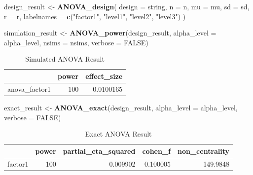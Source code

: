 \documentclass[
]{book}
\newenvironment{Shaded}{\begin{snugshade}}{\end{snugshade}}
\newcommand{\DataTypeTok}[1]{\textcolor[rgb]{0.13,0.29,0.53}{#1}}
\newcommand{\KeywordTok}[1]{\textcolor[rgb]{0.13,0.29,0.53}{\textbf{#1}}}
\newcommand{\NormalTok}[1]{#1}
\newcommand{\OtherTok}[1]{\textcolor[rgb]{0.56,0.35,0.01}{#1}}
\newcommand{\StringTok}[1]{\textcolor[rgb]{0.31,0.60,0.02}{#1}}
\begin{document}
\begin{Shaded}
\begin{Highlighting}[]
\NormalTok{design_result <-}\StringTok{ }\KeywordTok{ANOVA_design}\NormalTok{(}
  \DataTypeTok{design =}\NormalTok{ string,}
  \DataTypeTok{n =}\NormalTok{ n,}
  \DataTypeTok{mu =}\NormalTok{ mu,}
  \DataTypeTok{sd =}\NormalTok{ sd,}
  \DataTypeTok{r =}\NormalTok{ r,}
  \DataTypeTok{labelnames =} \KeywordTok{c}\NormalTok{(}\StringTok{"factor1"}\NormalTok{, }\StringTok{"level1"}\NormalTok{, }\StringTok{"level2"}\NormalTok{, }\StringTok{"level3"}\NormalTok{)}
\NormalTok{  )}
\end{Highlighting}
\end{Shaded}

\begin{Shaded}
\begin{Highlighting}[]
\NormalTok{simulation_result <-}\StringTok{ }\KeywordTok{ANOVA_power}\NormalTok{(design_result, }
                                 \DataTypeTok{alpha_level =}\NormalTok{ alpha_level, }
                                 \DataTypeTok{nsims =}\NormalTok{ nsims,}
                                 \DataTypeTok{verbose =} \OtherTok{FALSE}\NormalTok{)}
\end{Highlighting}
\end{Shaded}

\begin{table}[!h]

\caption{\label{tab:unnamed-chunk-50}Simulated ANOVA Result}
\centering
\begin{tabular}[t]{l|r|r}
\hline
  & power & effect\_size\\
\hline
anova\_factor1 & 100 & 0.0100165\\
\hline
\end{tabular}
\end{table}

\begin{Shaded}
\begin{Highlighting}[]
\NormalTok{exact_result <-}\StringTok{ }\KeywordTok{ANOVA_exact}\NormalTok{(design_result,}
                            \DataTypeTok{alpha_level =}\NormalTok{ alpha_level,}
                            \DataTypeTok{verbose =} \OtherTok{FALSE}\NormalTok{)}
\end{Highlighting}
\end{Shaded}

\begin{table}[!h]

\caption{\label{tab:unnamed-chunk-52}Exact ANOVA Result}
\centering
\begin{tabular}[t]{l|r|r|r|r}
\hline
  & power & partial\_eta\_squared & cohen\_f & non\_centrality\\
\hline
factor1 & 100 & 0.009902 & 0.100005 & 149.9848\\
\hline
\end{tabular}
\end{table}
\end{document}
